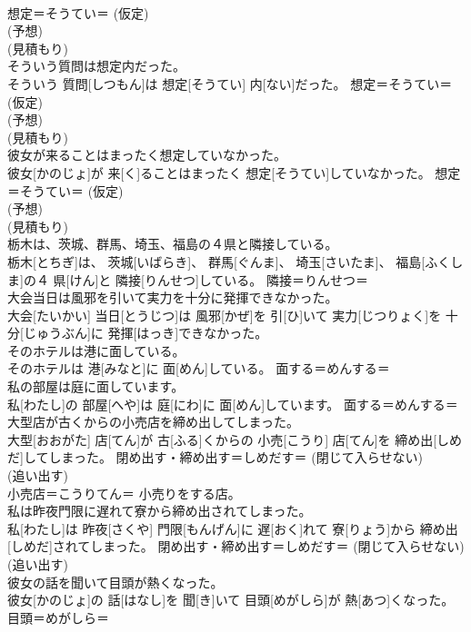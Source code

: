 \documentclass[8pt]{extreport}
\begin{document}
\begin{CJK}{UTF8}{min}
{\\	想定＝そうてい＝ (仮定) 
\\	(予想) 
\\	(見積もり) 
\\	そういう質問は想定内だった。	
\\	そういう 質問[しつもん]は 想定[そうてい] 内[ない]だった。	想定＝そうてい＝ (仮定) 
\\	(予想) 
\\	(見積もり) 
\\	彼女が来ることはまったく想定していなかった。	
\\	彼女[かのじょ]が 来[く]ることはまったく 想定[そうてい]していなかった。	想定＝そうてい＝ (仮定) 
\\	(予想) 
\\	(見積もり) 
\\	栃木は、茨城、群馬、埼玉、福島の４県と隣接している。	
\\	栃木[とちぎ]は、 茨城[いばらき]、 群馬[ぐんま]、 埼玉[さいたま]、 福島[ふくしま]の４ 県[けん]と 隣接[りんせつ]している。	隣接＝りんせつ＝ 
\\	大会当日は風邪を引いて実力を十分に発揮できなかった。	
\\	大会[たいかい] 当日[とうじつ]は 風邪[かぜ]を 引[ひ]いて 実力[じつりょく]を 十分[じゅうぶん]に 発揮[はっき]できなかった。	
\\	そのホテルは港に面している。	
\\	そのホテルは 港[みなと]に 面[めん]している。	面する＝めんする＝ 
\\	私の部屋は庭に面しています。	
\\	私[わたし]の 部屋[へや]は 庭[にわ]に 面[めん]しています。	面する＝めんする＝ 
\\	大型店が古くからの小売店を締め出してしまった。	
\\	大型[おおがた] 店[てん]が 古[ふる]くからの 小売[こうり] 店[てん]を 締め出[しめだ]してしまった。	閉め出す・締め出す＝しめだす＝ (閉じて入らせない) 
\\	(追い出す) 
\\	小売店＝こうりてん＝ 小売りをする店。
\\	私は昨夜門限に遅れて寮から締め出されてしまった。	
\\	私[わたし]は 昨夜[さくや] 門限[もんげん]に 遅[おく]れて 寮[りょう]から 締め出[しめだ]されてしまった。	閉め出す・締め出す＝しめだす＝ (閉じて入らせない) 
\\	(追い出す) 
\\	彼女の話を聞いて目頭が熱くなった。	
\\	彼女[かのじょ]の 話[はなし]を 聞[き]いて 目頭[めがしら]が 熱[あつ]くなった。	目頭＝めがしら＝ 
}
\end{CJK}
\end{document}
